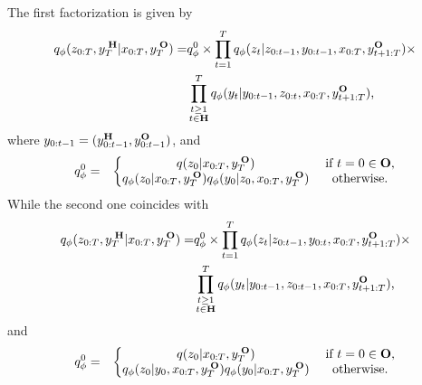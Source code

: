 The first factorization is given by
\begin{align}
\label{eq:fact-1}
q_\phi(z_{0:T}, y_{T}^{\;\mathbf{H}} | x_{0:T}, y_{T}^{\;\mathbf{O}})= & q_\phi^{0} \times  \prod_{t=1}^T  q_\phi(z_t|z_{0:t-1},y_{0:t-1},x_{0:T},y_{t+1:T}^{\mathbf{O}}) \times \nonumber \\ 
& \prod_{\substack{t\geq 1\\ t \in \mathbf{H}}}^T  q_\phi(y_t|y_{0:t-1},z_{0:t},x_{0:T},y_{t+1:T}^{\mathbf{O}}) \text{,}
\end{align}
where  $y_{0:t-1}=(y_{0:t-1}^{\mathbf{H}},y_{0:t-1}^{\mathbf{O}})$, and 
\begin{eqnarray*}
    \q^{0}&=& \left\{
    \begin{matrix}
    q(\latent_0| \obs_{0:T},\labl)  & \; \text{if }  t=0 \in \LL \text{,}\\ 
    \q(\latent_0| \obs_{0:T},\labl) \q(\lab_{0}|\latent_0, \obs_{0:T},\labl) & \; \text{otherwise.}
    \end{matrix} \right. %
\end{eqnarray*}
While the second one coincides  with 
\begin{align}
\label{eq:fact-2}
q_\phi(z_{0:T}, y_{T}^{\;\mathbf{H}}|x_{0:T}, y_{T}^{\;\mathbf{O}})=&  q_\phi^{0} \times  \prod_{t=1}^T  q_\phi(z_t|z_{0:t-1},y_{0:t},x_{0:T},y_{t+1:T}^{\mathbf{O}}) \times \nonumber \\ 
& \prod_{\substack{t\geq 1\\ t \in \mathbf{H}}}^T  q_\phi(y_t|y_{0:t-1},z_{0:t-1},x_{0:T},y_{t+1:T}^{\mathbf{O}}) \text{,}
\end{align}
and
\begin{eqnarray*}
    \q^{0}&=& \left\{
    \begin{matrix}
    q(\latent_0| \obs_{0:T},\labl)  & \; \text{if } t=0 \in \LL \text{,} \\ 
    \q(\latent_0|\lab_0, \obs_{0:T},\labl) \q(\lab_{0}|\obs_{0:T},\labl) & \; \text{otherwise.}
    \end{matrix} \right. %
\end{eqnarray*}


